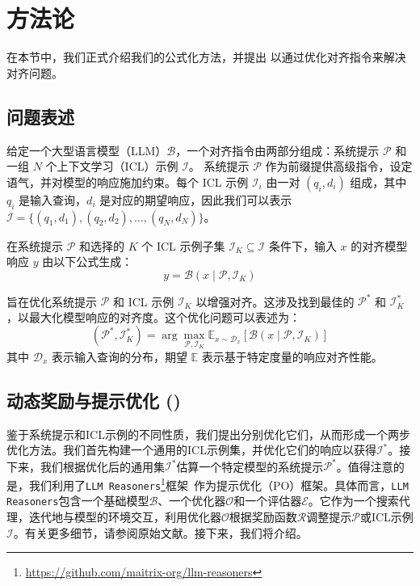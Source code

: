 \section{方法论}
\vspace{-5pt}

在本节中，我们正式介绍我们的公式化方法，并提出 \ours 以通过优化对齐指令来解决对齐问题。
\subsection{问题表述}

给定一个大型语言模型（LLM）$\mathcal{B}$，一个对齐指令由两部分组成：系统提示 $\mathcal{P}$ 和一组 $N$ 个上下文学习（ICL）示例 $\mathcal{I}$。
系统提示 $\mathcal{P}$ 作为前缀提供高级指令，设定语气，并对模型的响应施加约束。每个 ICL 示例 $\mathcal{I}_i$ 由一对 $(q_i, d_i)$ 组成，其中 $q_i$ 是输入查询，$d_i$ 是对应的期望响应，因此我们可以表示 $\mathcal{I} = \{(q_1, d_1), (q_2, d_2), \ldots, (q_N, d_N)\}$。

在系统提示 $\mathcal{P}$ 和选择的 $K$ 个 ICL 示例子集 $\mathcal{I}_K \subseteq \mathcal{I}$ 条件下，输入 $x$ 的对齐模型响应 $y$ 由以下公式生成：
\[
y = \mathcal{B}(x \mid \mathcal{P}, \mathcal{I}_K)
\]

\ours 旨在优化系统提示 $\mathcal{P}$ 和 ICL 示例 $\mathcal{I}_K$ 以增强对齐。这涉及找到最佳的 $\mathcal{P}^*$ 和 $\mathcal{I}_K^*$，以最大化模型响应的对齐度。这个优化问题可以表述为：
\[
(\mathcal{P}^*, \mathcal{I}_K^*) = \arg\max_{\mathcal{P}, \mathcal{I}_K} \mathbb{E}_{x \sim \mathcal{D}_x} \left[\mathcal{B}(x \mid \mathcal{P}, \mathcal{I}_K) \right]
\]
\noindent 其中 $\mathcal{D}_x$ 表示输入查询的分布，期望 $\mathbb{E}$ 表示基于特定度量的响应对齐性能。
\subsection{动态奖励与提示优化 (\ours)}

鉴于系统提示和ICL示例的不同性质，我们提出分别优化它们，从而形成一个两步优化方法。我们首先构建一个通用的ICL示例集，并优化它们的响应以获得$\mathcal{I}^*$。接下来，我们根据优化后的通用集$\mathcal{I}^*$估算一个特定模型的系统提示$\mathcal{P}^*$。值得注意的是，我们利用了\texttt{LLM Reasoners}\footnote{\url{https://github.com/maitrix-org/llm-reasoners}}框架~\cite{hao2023reasoning, hao2024llm}作为提示优化（PO）框架。具体而言，\texttt{LLM Reasoners}包含一个基础模型$\mathcal{B}$、一个优化器$\mathcal{O}$和一个评估器$\mathcal{E}$。它作为一个搜索代理，迭代地与模型的环境交互，利用优化器$\mathcal{O}$根据奖励函数$\mathcal{R}$调整提示$\mathcal{P}$或ICL示例$\mathcal{I}$。有关更多细节，请参阅原始文献。接下来，我们将介绍。
